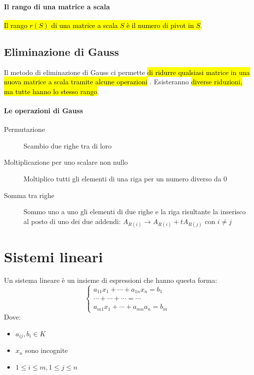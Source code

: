 \paragraph{Il rango di una matrice a scala} \hl{Il rango $r(S)$ di una matrice
a scala $S$ è il numero di pivot in $S$}.

\subsection{Eliminazione di Gauss}
Il metodo di eliminazione di Gauss ci permette \hl{di ridurre qualsiasi matrice
in una nuova matrice a scala tramite alcune operazioni }. Esisteranno \hl{diverse
riduzioni, ma tutte hanno lo stesso rango}.

\paragraph{Le operazioni di Gauss}
\begin{description}
    \item[Permutazione] Scambio due righe tra di loro
    \item[Moltiplicazione per uno scalare non nullo] Moltiplico tutti gli elementi
        di una riga per un numero diverso da $0$
    \item[Somma tra righe] Sommo uno a uno gli elementi di due righe e la riga
        risultante la inserisco al posto di uno dei due addendi:
        $A_{R(i)} \to A_{R(i)} + tA_{R(j)} \text{ con } i \neq j$
\end{description}

\section{Sistemi lineari}
Un sistema lineare è un insieme di espressioni che hanno questa forma:
\[
    \begin{cases}
        a_{11}x_1 + \cdots + a_{1n}x_n = b_1 \\
        \cdots + \cdots + \cdots = \cdots \\
        a_{m1}x_1 + \cdots + a_{mn}a_n = b_m
    \end{cases}
\]
Dove:
\begin{itemize}
    \item $a_{ij}, b_i \in K$
    \item $x_n$ sono incognite
    \item $1 \leq i \leq m, 1 \leq j \leq n$
\end{itemize}

